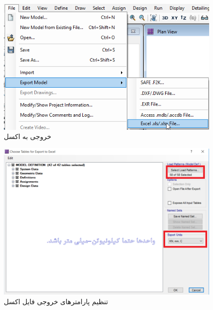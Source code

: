\begin{figure}[H]
    \centering
    \includegraphics[width=.7\linewidth]{figures/excel}
    \caption{خروجی به اکسل}
    \label{excel}
\end{figure}

\begin{figure}[H]
    \centering
    \includegraphics[width=.7\linewidth]{figures/excel2}
    \caption{تنظیم پارامترهای خروجی فایل اکسل}
    \label{excel2}
\end{figure}